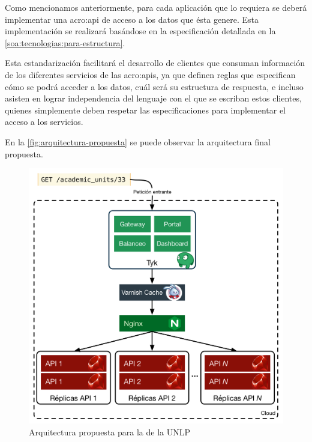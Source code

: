 Como mencionamos anteriormente, para cada aplicación que lo requiera se deberá implementar una \gls{acro:api} de acceso a los datos que ésta genere. Esta implementación se realizará basándose en la especificación  detallada en la \autoref{soa:tecnologias:para-estructura}.

Esta estandarización facilitará el desarrollo de clientes que consuman información de los diferentes servicios de las \glspl{acro:api}, ya que definen reglas que especifican cómo se podrá acceder a los datos, cuál será su estructura de respuesta, e incluso asisten en lograr independencia del lenguaje con el que se escriban estos clientes, quienes simplemente deben respetar las especificaciones para implementar el acceso a los servicios.

En la \autoref{fig:arquitectura-propuesta} se puede observar la arquitectura final propuesta.

\begin{figure}
  \includegraphics[width=\linewidth]{src/images/04-capitulo-4/propuesta-arquitectura-final.png}
  \caption{Arquitectura propuesta para la {\cloud} de la UNLP}
  \label{fig:arquitectura-propuesta}
\end{figure}
